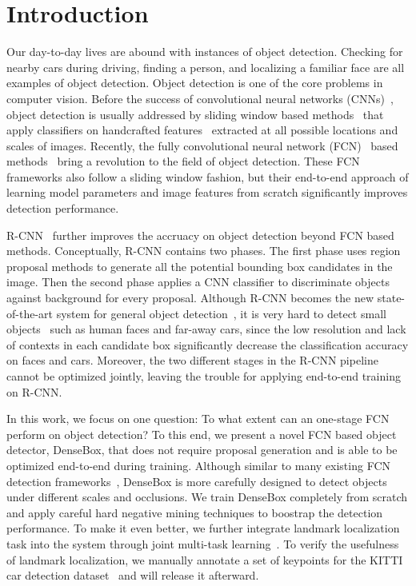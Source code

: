 \section{Introduction}

Our day-to-day lives are abound with instances of object detection. Checking for nearby cars during driving, finding a person, and localizing a familiar face are all examples of object detection. Object detection is one of the core problems in computer vision. Before the success of convolutional neural networks (CNNs)~\cite{krizhevsky2012imagenet}, object detection is usually addressed by sliding window based methods~\cite{felzenszwalb2010object, viola2004robust} that apply classifiers on handcrafted features~\cite{dalal2005histograms, lowe2004distinctive, cinbis2013segmentation} extracted at all possible locations and scales of images. Recently, the fully convolutional neural network (FCN)~\cite{long2014fully} based methods~\cite{sermanet2013overfeat, erhan2014scalable, YOLO} bring a revolution to the field of object detection. These FCN frameworks also follow a sliding window fashion, but their end-to-end approach of learning model parameters and image features from scratch significantly improves detection performance. 

R-CNN~\cite{girshick2014rich, girshick2015fast} further improves the accruacy on object detection beyond FCN based methods. Conceptually, R-CNN contains two phases. The first phase uses region proposal methods to generate all the potential bounding box candidates in the image. Then the second phase applies a CNN classifier to discriminate objects against background for every proposal. Although R-CNN becomes the new state-of-the-art system for general object detection~\cite{everingham2010pascal, russakovsky2014imagenet}, it is very hard to detect small objects~\cite{pepik2015holding} such as human faces and far-away cars, since the low resolution and lack of contexts in each candidate box significantly decrease the classification accuracy on faces and cars. Moreover, the two different stages in the R-CNN pipeline cannot be optimized jointly, leaving the trouble for applying end-to-end training on R-CNN. 

In this work, we focus on one question: To what extent can an one-stage FCN perform on object detection? To this end, we present a novel FCN based object detector, DenseBox, that does not require proposal generation and is able to be optimized end-to-end during training. Although similar to many existing FCN detection frameworks~\cite{sermanet2013overfeat, erhan2014scalable, YOLO}, DenseBox is more carefully designed to detect objects under different scales and occlusions. We train DenseBox completely from scratch and apply careful hard negative mining techniques to boostrap the detection performance. To make it even better, we further integrate landmark localization task into the system through joint multi-task learning~\cite{bengio2013representation}. To verify the usefulness of landmark localization, we manually annotate a set of keypoints for the KITTI car detection dataset~\cite{Geiger2012CVPR} and will release it afterward. 

